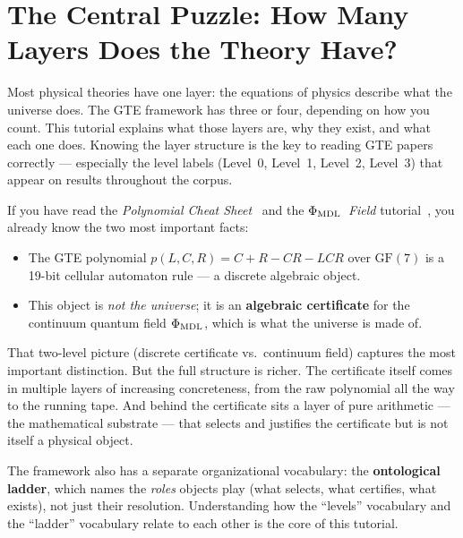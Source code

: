 \documentclass[11pt,a4paper]{article}
\newcommand{\term}[1]{\textbf{#1}}
\newcommand{\PHIMDL}{$\Phi_{\rm MDL}$}
\newcommand{\PhiMDL}{\Phi_{\rm MDL}}
\newcommand{\poly}{p}
\begin{document}
\section{The Central Puzzle: How Many Layers Does the Theory Have?}
\label{sec:puzzle}

\begin{tcolorbox}[colback=boxblue,colframe=blue!40!black,
  title=The question this tutorial answers]
Most physical theories have one layer: the equations of physics describe
what the universe does.
The GTE framework has three or four, depending on how you count.
This tutorial explains what those layers are, why they exist, and what
each one does.
Knowing the layer structure is the key to reading GTE papers
correctly --- especially the level labels (Level~0, Level~1, Level~2,
Level~3) that appear on results throughout the corpus.
\end{tcolorbox}

\bigskip
\noindent
If you have read the \emph{Polynomial Cheat Sheet}~\cite{SpivackTutorialPolynomial} and the \emph{\PHIMDL\ Field} tutorial~\cite{SpivackTutorialPhiMDL},
you already know the two most important facts:
\begin{itemize}[itemsep=4pt]
  \item The GTE polynomial $\poly(L,C,R) = C + R - CR - LCR$ over $\mathrm{GF}(7)$
    is a 19-bit cellular automaton rule --- a discrete algebraic object.
  \item This object is \emph{not the universe}; it is an \term{algebraic certificate}
    for the continuum quantum field $\PhiMDL$, which is what the universe
    is made of.
\end{itemize}
That two-level picture (discrete certificate vs.\ continuum field) captures the
most important distinction.
But the full structure is richer.
The certificate itself comes in multiple layers of increasing concreteness,
from the raw polynomial all the way to the running tape.
And behind the certificate sits a layer of pure arithmetic --- the
mathematical substrate --- that selects and justifies the certificate but
is not itself a physical object.

\medskip
The framework also has a separate organizational vocabulary: the
\term{ontological ladder}, which names the \emph{roles} objects play
(what selects, what certifies, what exists), not just their resolution.
Understanding how the ``levels'' vocabulary and the ``ladder'' vocabulary
relate to each other is the core of this tutorial.
\end{document}
